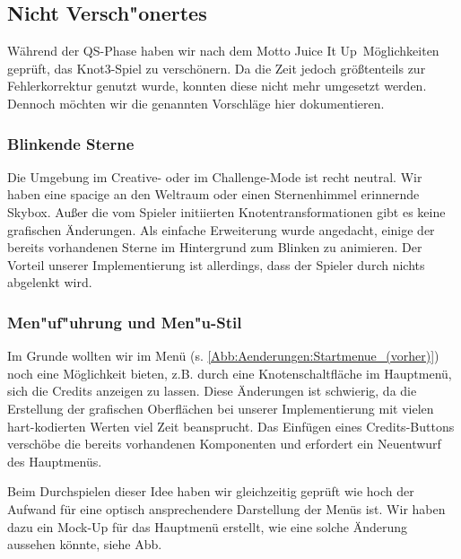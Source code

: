 %



\newpage



\subsection{Nicht Versch{"o}nertes} %
\label{Abschnitt:Aenderungen:Protokoll:Verschoenerungen:Nicht}

Während der QS-Phase haben wir nach dem Motto \glqq Juice It Up\grqq~Möglichkeiten geprüft, das Knot3-Spiel zu verschönern. Da die Zeit jedoch größtenteils zur Fehlerkorrektur genutzt wurde, konnten diese nicht mehr umgesetzt werden. Dennoch möchten wir die genannten Vorschläge hier dokumentieren.\\


\subsubsection*{Blinkende Sterne}
\label{Abschnitt:Aenderungen:Protokoll:Verschoenerungen:Nicht:Blinkende_Sterne}

Die Umgebung im Creative- oder im Challenge-Mode ist recht neutral. Wir haben eine spacige an den Weltraum oder einen Sternenhimmel erinnernde Skybox. Außer die vom Spieler initiierten Knotentransformationen gibt es keine grafischen Änderungen. Als einfache Erweiterung wurde angedacht, einige der bereits vorhandenen Sterne im Hintergrund zum Blinken zu animieren. Der Vorteil unserer Implementierung ist allerdings, dass der Spieler durch nichts abgelenkt wird.\\

\subsubsection*{Men{"u}f{"u}hrung und Men{"u}-Stil}
\label{Abschnitt:Aenderungen:Protokoll:Verschoenerungen:Nicht:Menues}

Im Grunde wollten wir im Menü (s. \ref{Abb:Aenderungen:Startmenue_(vorher)}) noch eine Möglichkeit bieten, z.B. durch eine Knotenschaltfläche im Hauptmenü, sich die Credits anzeigen zu lassen. Diese Änderungen ist schwierig, da die Erstellung der grafischen Oberflächen bei unserer Implementierung mit vielen hart-kodierten Werten viel Zeit beansprucht. Das Einfügen eines Credits-Buttons verschöbe die bereits vorhandenen Komponenten und erfordert ein Neuentwurf des Hauptmenüs. 

Beim Durchspielen dieser Idee haben wir gleichzeitig geprüft wie hoch der Aufwand für eine optisch ansprechendere Darstellung der Menüs ist. Wir haben dazu ein Mock-Up für das Hauptmenü erstellt, wie eine solche Änderung aussehen könnte, siehe Abb.\\








